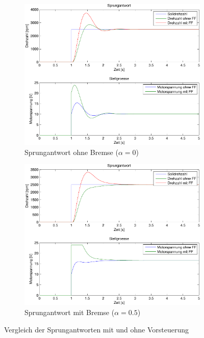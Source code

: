 \begin{figure}[h!]
	\centering
	\begin{subfigure}{0.475\textwidth}
		\includegraphics[width=1\textwidth]{13/step_noload.pdf}
		\caption{Sprungantwort ohne Bremse ($\alpha = 0$)}
	\end{subfigure}
	\hfill{}
	\begin{subfigure}{0.475\textwidth}
		\includegraphics[width=1\textwidth]{13/step_load.pdf}
		\caption{Sprungantwort mit Bremse ($\alpha = 0.5$)}
	\end{subfigure}
	\caption{Vergleich der Sprungantworten mit und ohne Vorsteuerung}
\end{figure}
